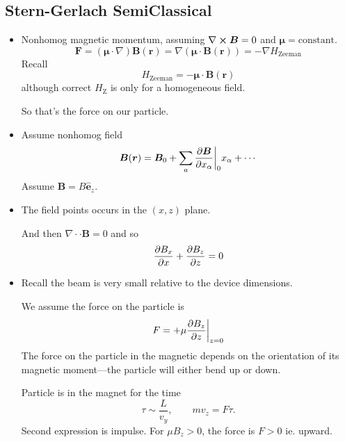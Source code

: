 \documentclass[11pt, a4paper]{article}
\renewcommand{\div}{\nabla \cdot}
\renewcommand{\curl}{\nabla \cross}
\renewcommand{\grad}{\nabla}
\renewcommand{\vec}[1]{\bm{#1}}  %
\newcommand{\uvec}[1]{\hat{\vec{#1}}}  %
\renewcommand{\r}{\vec{r}}  %
\newcommand{\B}{\vec{B}}  %
\newcommand{\m}{\vec{\mu}}  %
\begin{document}
\subsection{Stern-Gerlach SemiClassical}
\begin{itemize}
    \item Nonhomog magnetic momentum, assuming $ \curl \B = 0 $ and $ \m = \text{constant} $.
    \begin{equation*}
        \vec{F} = (\vec{\mu} \cdot \grad)\B(\r) = \grad (\m \cdot \B(\r)) = - \grad H_{\text{Zeeman}}
    \end{equation*}
    Recall
    \begin{equation*}
        H_{\text{Zeeman}} = - \m \cdot \B(\r)
    \end{equation*}
    although correct $ H_{\text{Z}}  $ is only for a homogeneous field.

    So that's the force on our particle.

    \item Assume nonhomog field
    \begin{equation*}
        \B(\r) = \B_{0} + \sum_{a} \pdv{\B}{x_{\alpha}}\bigg |_{0} x_{\alpha} + \cdots
    \end{equation*}
    Assume $ \B = B \uvec{e}_{z} $. 


    \item The field points occurs in the $ (x, z) $ plane. 
    
    And then $ \div \cdot \B  = 0 $ and so
    \begin{equation*}
        \pdv{B_{x}}{x} + \pdv{B_{z}}{z} = 0
    \end{equation*}
    
    \item Recall the beam is very small relative to the device dimensions. 

    We assume the force on the particle is
    \begin{equation*}
        F = + \mu \pdv{B_{z}}{z} \bigg |_{z = 0}
    \end{equation*}
    The force on the particle in the magnetic depends on the orientation of its magnetic moment---the particle will either bend up or down.

    Particle is in the magnet for the time
    \begin{equation*}
        \tau \sim \frac{L}{v_{y}}, \qquad m v_{z} = F \tau.
    \end{equation*}
    Second expression is impulse. For $ \mu B_{z} > 0 $, the force is $ F > 0 $ ie. upward. 


\end{itemize}
\end{document}

